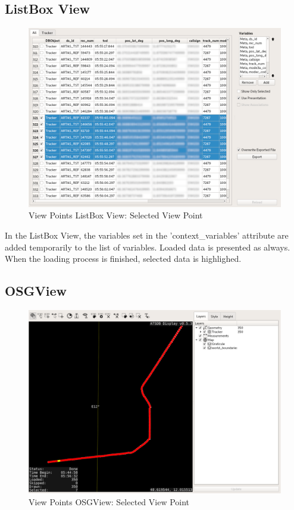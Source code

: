 \subsection{ListBox View} 

\begin{figure}[H]
    \hspace*{-2cm}
    \includegraphics[width=18cm,frame]{figures/view_points_listbox_selected.png}
  \caption{View Points ListBox View: Selected View Point}
\end{figure}

In the ListBox View, the variables set in the 'context\_variables' attribute are added temporarily to the list of variables. Loaded data is presented as always. When the loading process is finished, selected data is highlighed.


\subsection{OSGView}

\begin{figure}[H]
    \hspace*{-2cm}
    \includegraphics[width=18cm,frame]{figures/view_points_osgview_selected.png}
  \caption{View Points OSGView: Selected View Point}
\end{figure}

